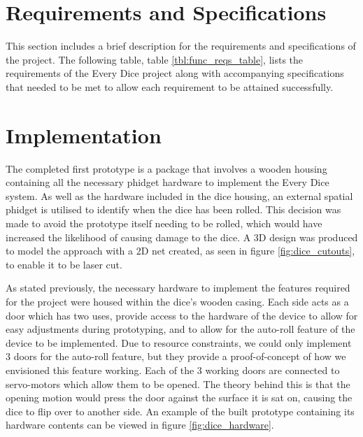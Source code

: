 \documentclass{sigchi}
\begin{document}
\section{Requirements and Specifications}

This section includes a brief description for the requirements and specifications of the project. The following table, table \ref{tbl:func_reqs_table}, lists the requirements of the Every Dice project along with accompanying specifications that needed to be met to allow each requirement to be attained successfully.

\onecolumn
\vspace{2em}


\twocolumn
\section{Implementation}

The completed first prototype is a package that involves a wooden housing containing all the necessary phidget hardware to implement the Every Dice system. As well as the hardware included in the dice housing, an external spatial phidget is utilised to identify when the dice has been rolled. This decision was made to avoid the prototype itself needing to be rolled, which would have increased the likelihood of causing damage to the dice. A 3D design was produced to model the approach with a 2D net created, as seen in figure \ref{fig:dice_cutouts}, to enable it to be laser cut.

 

As stated previously, the necessary hardware to implement the features required for the project were housed within the dice's wooden casing. Each side acts as a door which has two uses, provide access to the hardware of the device to allow for easy adjustments during prototyping, and to allow for the auto-roll feature of the device to be implemented. Due to resource constraints, we could only implement 3 doors for the auto-roll feature, but they provide a proof-of-concept of how we envisioned this feature working. Each of the 3 working doors are connected to servo-motors which allow them to be opened. The theory behind this is that the opening motion would press the door against the surface it is sat on, causing the dice to flip over to another side. An example of the built prototype containing its hardware contents can be viewed in figure \ref{fig:dice_hardware}.

  
\end{document}
